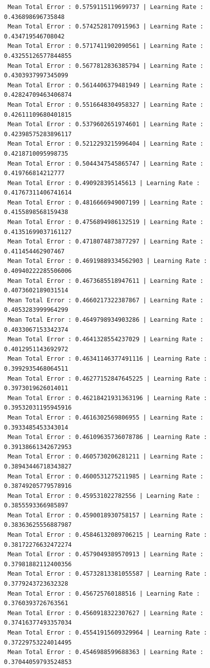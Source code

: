 \documentclass[]{report}
\begin{document}
\begin{verbatim}
 Mean Total Error : 0.5759115119699737 | Learning Rate : 0.436898696735848
 Mean Total Error : 0.5742528170915963 | Learning Rate : 0.434719546708042
 Mean Total Error : 0.5717411902090561 | Learning Rate : 0.43255126577844855
 Mean Total Error : 0.5677812836385794 | Learning Rate : 0.4303937997345099
 Mean Total Error : 0.5614406379481949 | Learning Rate : 0.42824709463406874
 Mean Total Error : 0.5516648304958327 | Learning Rate : 0.42611109680401815
 Mean Total Error : 0.5379602651974601 | Learning Rate : 0.42398575283896117
 Mean Total Error : 0.5212293215996404 | Learning Rate : 0.4218710095998735
 Mean Total Error : 0.5044347545865747 | Learning Rate : 0.419766814212777
 Mean Total Error : 0.490928395145613 | Learning Rate : 0.41767311406741614
 Mean Total Error : 0.4816666949007199 | Learning Rate : 0.4155898568159438
 Mean Total Error : 0.4756894986132519 | Learning Rate : 0.41351699037161127
 Mean Total Error : 0.4718074873877297 | Learning Rate : 0.411454462907467
 Mean Total Error : 0.46919889334562903 | Learning Rate : 0.40940222285506006
 Mean Total Error : 0.4673685518947611 | Learning Rate : 0.4073602189031514
 Mean Total Error : 0.4660217322387867 | Learning Rate : 0.4053283999964299
 Mean Total Error : 0.4649798934903286 | Learning Rate : 0.4033067153342374
 Mean Total Error : 0.4641328554237029 | Learning Rate : 0.4012951143692972
 Mean Total Error : 0.46341146377491116 | Learning Rate : 0.3992935468064511
 Mean Total Error : 0.46277152847645225 | Learning Rate : 0.3973019626014011
 Mean Total Error : 0.46218421931363196 | Learning Rate : 0.39532031195945916
 Mean Total Error : 0.4616302569806955 | Learning Rate : 0.3933485453343014
 Mean Total Error : 0.46109635736078786 | Learning Rate : 0.39138661342672953
 Mean Total Error : 0.4605730206281211 | Learning Rate : 0.38943446718343827
 Mean Total Error : 0.4600531275211985 | Learning Rate : 0.38749205779578916
 Mean Total Error : 0.459531022782556 | Learning Rate : 0.3855593366985897
 Mean Total Error : 0.4590018930758157 | Learning Rate : 0.38363625556887987
 Mean Total Error : 0.45846132089706215 | Learning Rate : 0.38172276632472274
 Mean Total Error : 0.4579049389570913 | Learning Rate : 0.37981882112400356
 Mean Total Error : 0.45732813381055587 | Learning Rate : 0.3779243723632328
 Mean Total Error : 0.456725760188516 | Learning Rate : 0.3760393726763561
 Mean Total Error : 0.4560918322307627 | Learning Rate : 0.37416377493357034
 Mean Total Error : 0.45541915609329964 | Learning Rate : 0.37229753224014495
 Mean Total Error : 0.4546988599688363 | Learning Rate : 0.37044059793524853

\end{verbatim}
\end{document}
